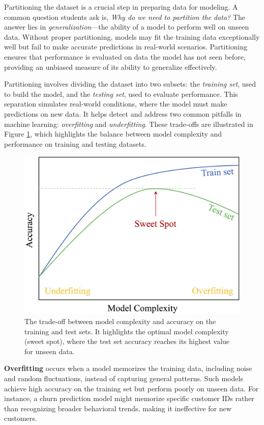 \documentclass[
]{book}
\theoremstyle{definition}
\theoremstyle{definition}
\theoremstyle{definition}
\theoremstyle{definition}
\theoremstyle{remark}
\begin{document}
Partitioning the dataset is a crucial step in preparing data for modeling. A common question students ask is, \emph{Why do we need to partition the data?} The answer lies in \emph{generalization}---the ability of a model to perform well on unseen data. Without proper partitioning, models may fit the training data exceptionally well but fail to make accurate predictions in real-world scenarios. Partitioning ensures that performance is evaluated on data the model has not seen before, providing an unbiased measure of its ability to generalize effectively.

Partitioning involves dividing the dataset into two subsets: the \emph{training set}, used to build the model, and the \emph{testing set}, used to evaluate performance. This separation simulates real-world conditions, where the model must make predictions on new data. It helps detect and address two common pitfalls in machine learning: \emph{overfitting} and \emph{underfitting}. These trade-offs are illustrated in Figure \ref{fig:model-complexity}, which highlights the balance between model complexity and performance on training and testing datasets.

\begin{figure}

{\centering \includegraphics[width=0.65\linewidth]{images/ch6_model_complexity} 

}

\caption{The trade-off between model complexity and accuracy on the training and test sets. It highlights the optimal model complexity (sweet spot), where the test set accuracy reaches its highest value for unseen data.}\label{fig:model-complexity}
\end{figure}

\textbf{Overfitting} occurs when a model memorizes the training data, including noise and random fluctuations, instead of capturing general patterns. Such models achieve high accuracy on the training set but perform poorly on unseen data. For instance, a churn prediction model might memorize specific customer IDs rather than recognizing broader behavioral trends, making it ineffective for new customers.
\end{document}
